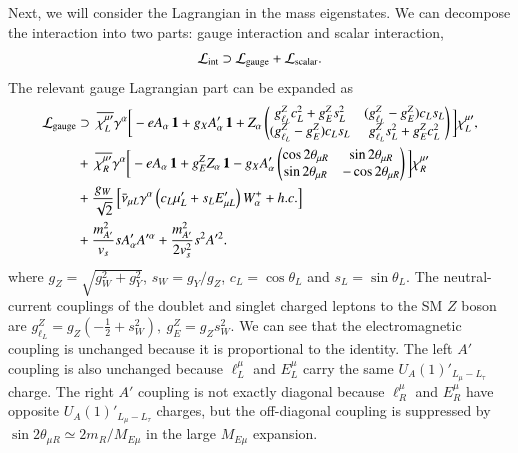 \documentclass[onecolumn, aps, nofootinbib, prd, preprint, floats, floatfix, amsmath, amssymb, superscriptaddress, preprintnumbers]{revtex4-1}
\begin{document}
Next, we will consider the Lagrangian in the mass eigenstates. We can decompose the interaction into two parts: gauge interaction and scalar interaction,
\begin{equation}
    \mathcal{L}_{\rm int}\supset \mathcal{L}_{\rm gauge} + \mathcal{L}_{\rm scalar}.
\end{equation}
The relevant gauge Lagrangian part can be expanded as
\begin{equation}
\begin{aligned}
\mathcal{L}_{\rm gauge}
&\supset~
\overline{\chi^{\mu\prime}_L}\gamma^\alpha
\bigg[-eA_\alpha\,\mathbf{1}+g_X A'_\alpha\,\mathbf{1} +Z_\alpha
\begin{pmatrix}
g_{\ell_L}^Z c_L^2+g_E^Z s_L^2 & (g_{\ell_L}^Z-g_E^Z)c_Ls_L\\
(g_{\ell_L}^Z-g_E^Z)c_Ls_L & g_{\ell_L}^Z s_L^2+g_E^Z c_L^2
\end{pmatrix}
\bigg] \chi^{\mu\prime}_L,\\
&+~\overline{\chi^{\mu\prime}_R}\gamma^\alpha
\bigg[ -eA_\alpha\,\mathbf{1} +g_E^ZZ_\alpha\,\mathbf{1} -g_XA'_\alpha
\begin{pmatrix}
\cos2\theta_{\mu R} & \sin2\theta_{\mu R}\\
\sin2\theta_{\mu R} & -\cos2\theta_{\mu R}
\end{pmatrix}\bigg]\chi^{\mu\prime}_R\\
&+\frac{g_W}{\sqrt2}
\left[
\bar\nu_{\mu L}\gamma^\alpha
\left(c_L\mu'_L+s_L E'_{\mu L}\right)W^+_\alpha
+h.c.
\right]\\
&+ \frac{m_{A'}^2}{v_s}s A'_\alpha A'^\alpha + \frac{m_{A'}^2}{2 v_s^2}s^2 A'^2.
\end{aligned}
\label{eq:mass-basis-NC}
\end{equation} 
where $g_Z=\sqrt{g_W^2+g_Y^2}$, $s_W=g_Y/g_Z$, $c_L=\cos\theta_L$ and $s_L=\sin\theta_L$. The neutral-current couplings of the doublet and singlet charged leptons to the SM $Z$ boson are $g_{\ell_L}^Z=g_Z\left(-\frac12+s_W^2\right), ~g_E^Z=g_Z s_W^2$. We can see that the electromagnetic coupling is unchanged because it is proportional to the identity. The left $A'$ coupling is also unchanged because $\ell_L^\mu$ and $E_L^\mu$ carry the same $U_A(1)'_{L_\mu-L_\tau}$ charge. The right $A'$ coupling is not exactly diagonal because $\ell_R^\mu$ and $E_R^\mu$ have opposite $U_A(1)'_{L_\mu-L_\tau}$ charges, but the off-diagonal coupling is suppressed by $\sin2\theta_{\mu R}\simeq 2m_R/M_{E\mu}$ in the large $M_{E\mu}$ expansion.
\end{document}
